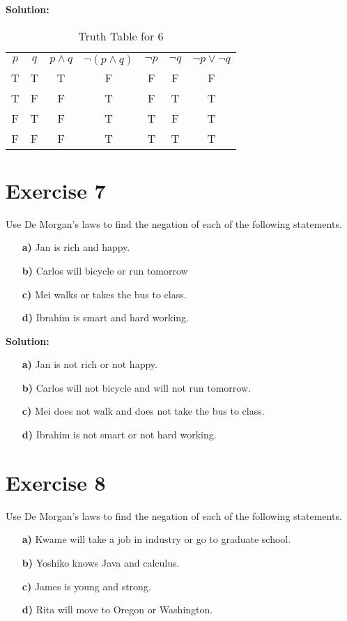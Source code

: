\documentclass{Axon}
\begin{document}
\noindent
\textbf{Solution:}

\begin{table}[ht]
    \centering
    \begin{tabular}{c|c|c|c|c|c|c}
        \(p\) & \(q\) & \(p \land q\) & \(\lnot (p \land q)\) & \(\lnot p\) & \(\lnot q\) & \(\lnot p \lor \lnot q\) \\
        T     & T     & T             & F                     & F           & F           & F                        \\
        T     & F     & F             & T                     & F           & T           & T                        \\
        F     & T     & F             & T                     & T           & F           & T                        \\
        F     & F     & F             & T                     & T           & T           & T
    \end{tabular}
    \caption{Truth Table for 6}
\end{table}

\section*{Exercise 7}
Use De Morgan's laws to find the negation of each of the following statements.
\begin{enumerate}
    \item[\textbf{a)}] Jan is rich and happy.
    \item[\textbf{b)}] Carlos will bicycle or run tomorrow
    \item[\textbf{c)}] Mei walks or takes the bus to class.
    \item[\textbf{d)}] Ibrahim is smart and hard working.
\end{enumerate}

\noindent
\textbf{Solution:}
\begin{enumerate}
    \item[\textbf{a)}] Jan is not rich or not happy.
    \item[\textbf{b)}] Carlos will not bicycle and will not run tomorrow.
    \item[\textbf{c)}] Mei does not walk and does not take the bus to class.
    \item[\textbf{d)}] Ibrahim is not smart or not hard working.
\end{enumerate}

\section*{Exercise 8}
Use De Morgan's laws to find the negation of each of the following statements.
\begin{enumerate}
    \item[\textbf{a)}] Kwame will take a job in industry or go to graduate school.
    \item[\textbf{b)}] Yoshiko knows Java and calculus.
    \item[\textbf{c)}] James is young and strong.
    \item[\textbf{d)}] Rita will move to Oregon or Washington.
\end{enumerate}
\end{document}

